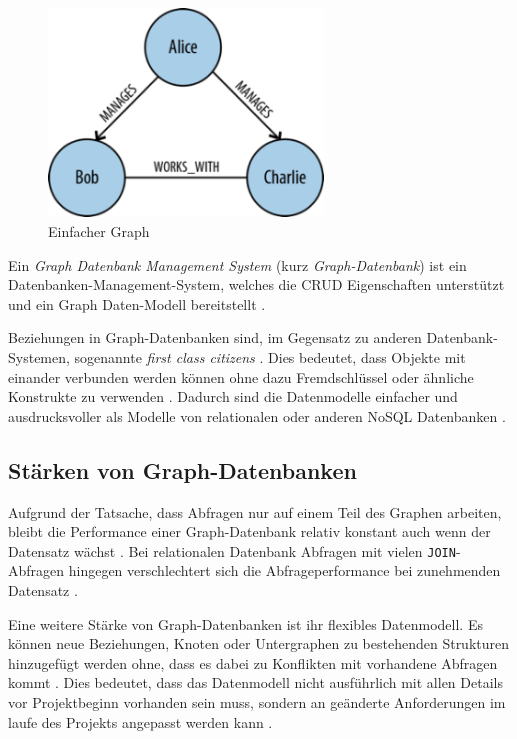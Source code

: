 \begin{figure}[h]
    \myfloatalign
    \includegraphics[width=0.65\textwidth]{gfx/simple_graph.png}
    \caption{Einfacher Graph \cite{neo4jblog:graph}}
    \label{fig:simple_graph}
\end{figure}

Ein \emph{Graph Datenbank Management System} (kurz \emph{Graph-Datenbank}) ist ein Datenbanken-Management-System, welches die \ac{CRUD} Eigenschaften unterstützt und ein Graph Daten-Modell bereitstellt \cite{robinsongraph:2015}.

Beziehungen in Graph-Datenbanken sind, im Gegensatz zu anderen Datenbank-Systemen, sogenannte \emph{first class citizens} \cite{robinsongraph:2015}. Dies bedeutet, dass Objekte mit einander verbunden werden können ohne dazu Fremdschlüssel oder ähnliche Konstrukte zu verwenden \cite{robinsongraph:2015}. Dadurch sind die Datenmodelle einfacher und ausdrucksvoller als Modelle von relationalen oder anderen \ac{NoSQL} Datenbanken \cite{robinsongraph:2015} .

\subsection{Stärken von Graph-Datenbanken}
Aufgrund der Tatsache, dass Abfragen nur auf einem Teil des Graphen arbeiten, bleibt die Performance einer Graph-Datenbank relativ konstant auch wenn der Datensatz wächst \cite{robinsongraph:2015}. Bei relationalen Datenbank Abfragen mit vielen \verb|JOIN|-Abfragen hingegen verschlechtert sich die Abfrageperformance bei zunehmenden Datensatz \cite{robinsongraph:2015}. 

Eine weitere Stärke von Graph-Datenbanken ist ihr flexibles Datenmodell. Es können neue Beziehungen, Knoten oder Untergraphen zu bestehenden Strukturen hinzugefügt werden ohne, dass es dabei zu Konflikten mit vorhandene Abfragen kommt \cite{robinsongraph:2015}. Dies bedeutet, dass das Datenmodell nicht ausführlich mit allen Details vor Projektbeginn vorhanden sein muss, sondern an geänderte Anforderungen im laufe des Projekts angepasst werden kann \cite{robinsongraph:2015}. 
